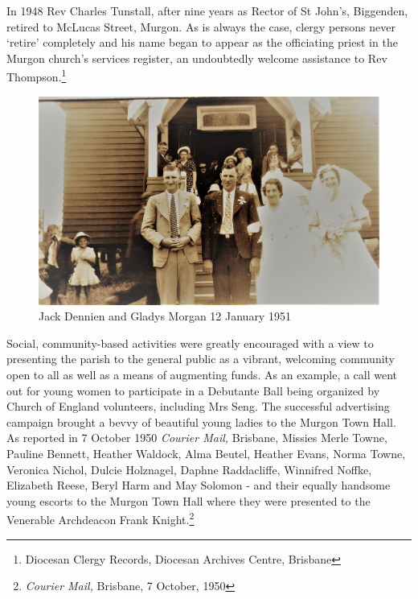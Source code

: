 In 1948 Rev Charles Tunstall, after nine years as Rector of St John's, Biggenden, retired to McLucas Street, Murgon. As is always the case, clergy persons never `retire' completely and his name began to appear as the officiating priest in the Murgon church's services register, an undoubtedly welcome assistance to Rev Thompson.\footnote{Diocesan Clergy Records, Diocesan Archives Centre, Brisbane}








\begin{figure}[!htb]
\begin{center}
\includegraphics[width=1.\textwidth,center]{../images/JackDennienGladysMorgan12Jan1951.jpg}
\caption{Jack Dennien and Gladys Morgan 12 January 1951}
\end{center}
\end{figure}




Social, community-based activities were greatly encouraged with a view to presenting the parish to the general public as a vibrant, welcoming community open to all as well as a means of augmenting funds. As an example, a call went out for young women to participate in a Debutante Ball being organized by Church of England volunteers, including Mrs Seng. The successful advertising campaign brought a bevvy of beautiful young ladies to the Murgon Town Hall. As reported in 7 October 1950 \emph{Courier Mail,} Brisbane, Missies Merle Towne, Pauline Bennett, Heather Waldock, Alma Beutel, Heather Evans, Norma Towne, Veronica Nichol, Dulcie Holznagel, Daphne Raddacliffe, Winnifred Noffke, Elizabeth Reese, Beryl Harm and May Solomon - and their equally handsome young escorts to the Murgon Town Hall where they were presented to the Venerable Archdeacon Frank Knight.\footnote{\emph{Courier Mail,} Brisbane, 7 October, 1950}


